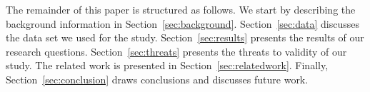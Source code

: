 \par
The remainder of this paper is structured as follows. 
We start by describing the background information in Section~\ref{sec:background}. 
Section~\ref{sec:data} discusses the data set we used for the study. 
Section~\ref{sec:results} presents the results of our research questions. 
Section~\ref{sec:threats} presents the threats to validity of our study.
The related work is presented in Section~\ref{sec:relatedwork}. 
Finally, Section~\ref{sec:conclusion} draws conclusions and discusses future work.
